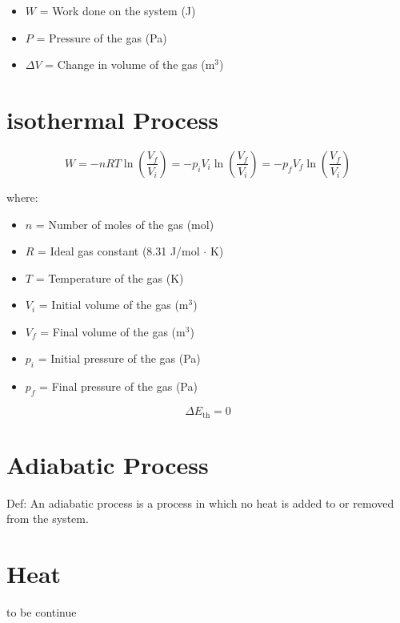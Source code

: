 \documentclass{article}
\begin{document}
    
    \begin{itemize}
        \item $W$ = Work done on the system (J)
        \item $P$ = Pressure of the gas (Pa)
        \item $\Delta V$ = Change in volume of the gas (m$^3$)
    \end{itemize}

\section*{isothermal Process}

\begin{equation}
    W = - nRT \ln \left( \frac{V_f}{V_i} \right) = - p_i V_i \ln \left( \frac{V_f}{V_i} \right) = - p_f V_f \ln \left( \frac{V_f}{V_i} \right)
\end{equation}

where:
\begin{itemize}
    \item $n$ = Number of moles of the gas (mol)
    \item $R$ = Ideal gas constant (8.31 J/mol $\cdot$ K)
    \item $T$ = Temperature of the gas (K)
    \item $V_i$ = Initial volume of the gas (m$^3$)
    \item $V_f$ = Final volume of the gas (m$^3$)
    \item $p_i$ = Initial pressure of the gas (Pa)
    \item $p_f$ = Final pressure of the gas (Pa)
\end{itemize}


\vspace{1cm}

\begin{equation}
    \Delta E_{\text{th}} = 0
\end{equation}


\section*{Adiabatic Process}
Def: An adiabatic process is a process in which no heat is added to or removed from the system.

\section*{Heat}

to be continue
\end{document}
